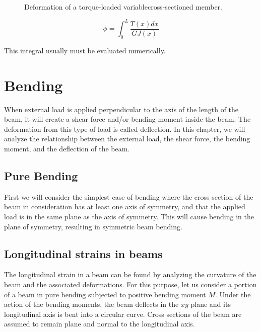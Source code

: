 \documentclass[
10pt,
a4paper,
openany,
svgnames,
]{book}
\begin{document}
\begin{enumerate}
  \begin{figure}[h]
    \centering
    \caption{Deformation of a torque-loaded variablecross-sectioned member.}
  \end{figure}
  
  \begin{equation}
    \phi  = \int_0^L \frac{T(x)dx}{GJ(x)}
  \end{equation}

  This integral usually must be evaluated numerically.
\end{enumerate}

\section{Bending} \label{section: bending}

When external load is applied perpendicular to the axis of the length of the beam, it will create a shear force and/or bending moment inside the beam. The deformation from this type of load is called deflection. In this chapter, we will analyze the relationship between the external load, the shear force, the bending moment, and the deflection of the beam.

\subsection{Pure Bending}

First we will consider the simplest case of bending where the cross section of the beam in consideration has at least one axis of symmetry, and that the applied load is in the same plane as the axis of symmetry. This will cause bending in the plane of symmetry, resulting in symmetric beam bending.

\subsection{Longitudinal strains in beams}

The longitudinal strain in a beam can be found by analyzing the curvature of the beam and the associated deformations. For this purpose, let us consider a portion of a beam in pure bending subjected to positive bending moment $M$. Under the action of the bending moments, the beam deflects in the $xy$ plane and its longitudinal axis is bent into a circular curve. Cross sections of the beam are assumed to remain plane and normal to the longitudinal axis.
\end{document}
